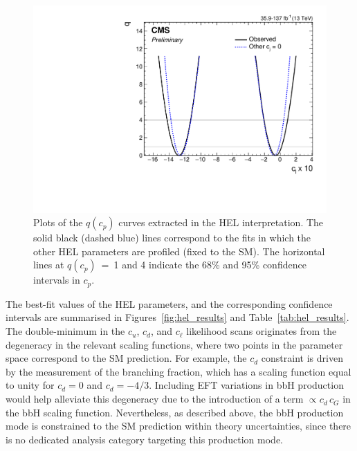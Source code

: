 \begin{figure}[htbp]
  \includegraphics[width=.42\linewidth]{Figures/eft/cl_likelihood.pdf}
  \caption[Likelihood scans of the HEL parameters]
  {
    Plots of the $q(c_p)$ curves extracted in the HEL interpretation. The solid black (dashed blue) lines correspond to the fits in which the other HEL parameters are profiled (fixed to the SM). The horizontal lines at $q(c_p)$~=~1 and 4 indicate the 68\% and 95\% confidence intervals in $c_p$.
  }
  \label{fig:hel_likelihood_scans}
\end{figure}

The best-fit values of the HEL parameters, and the corresponding confidence intervals are summarised in Figures~\ref{fig:hel_results} and Table~\ref{tab:hel_results}. The double-minimum in the $c_u$, $c_d$, and $c_\ell$ likelihood scans originates from the degeneracy in the relevant scaling functions, where two points in the parameter space correspond to the SM prediction. For example, the $c_d$ constraint is driven by the measurement of the \Hbb branching fraction, which has a scaling function equal to unity for $c_d=0$ and $c_d=-4/3$. Including EFT variations in bbH production would help alleviate this degeneracy due to the introduction of a term $\propto c_d\,c_G$ in the bbH scaling function. Nevertheless, as described above, the bbH production mode is constrained to the SM prediction within theory uncertainties, since there is no dedicated analysis category targeting this production mode. 

